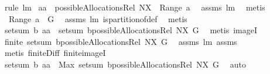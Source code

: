 \begin{isabellebody}
\ {\isacharparenleft}rule\ lm{}{}{\isacharparenright}\isanewline
{}\isamarkupfalse%
\ {\isachardoublequoteopen}{\isacharquery}aa\ {\isasymin}\ possibleAllocationsRel\ {\isacharparenleft}N{\isacharminus}X{\isacharparenright}\ {\isacharparenleft}{\isasymUnion}\ {\isacharparenleft}Range\ a{\isacharparenright}{\isacharparenright}{\isachardoublequoteclose}\ \isamarkupfalse%
\ assms\ lm{}{}\ \isamarkupfalse%
\ metis\isanewline
{}\isamarkupfalse%
\ \isamarkupfalse%
\ {\isachardoublequoteopen}{\isasymUnion}\ {\isacharparenleft}Range\ a{\isacharparenright}\ {\isacharequal}\ G{\isachardoublequoteclose}\ \isamarkupfalse%
\ assms\ lm{}{}\ is{\isacharunderscore}partition{\isacharunderscore}of{\isacharunderscore}def\ \isamarkupfalse%
\ metis\isanewline
{}\isamarkupfalse%
\ \isamarkupfalse%
\ {\isachardoublequoteopen}setsum\ b\ {\isacharquery}aa\ {\isasymin}\ {\isacharparenleft}setsum\ b{\isacharparenright}{\isacharbackquote}{\isacharparenleft}possibleAllocationsRel\ {\isacharparenleft}N{\isacharminus}X{\isacharparenright}\ G{\isacharparenright}{\isachardoublequoteclose}\ \isamarkupfalse%
\ {\isacharparenleft}metis\ imageI{\isacharparenright}\isanewline
{}\isamarkupfalse%
\ \isamarkupfalse%
\ {\isachardoublequoteopen}finite\ {\isacharparenleft}{\isacharparenleft}setsum\ b{\isacharparenright}{\isacharbackquote}{\isacharparenleft}possibleAllocationsRel\ {\isacharparenleft}N{\isacharminus}X{\isacharparenright}\ G{\isacharparenright}{\isacharparenright}{\isachardoublequoteclose}\ \isamarkupfalse%
\ assms\ lm{}{}\ assms{\isacharparenleft}{}{\isacharcomma}{}{\isacharparenright}\isanewline
{}\isamarkupfalse%
\ {\isacharparenleft}metis\ finite{\isacharunderscore}Diff\ finite{\isacharunderscore}imageI{\isacharparenright}\isanewline
{}\isamarkupfalse%
\ \isamarkupfalse%
\ {\isachardoublequoteopen}setsum\ b\ {\isacharquery}aa\ {\isasymle}\ Max\ {\isacharparenleft}{\isacharparenleft}setsum\ b{\isacharparenright}{\isacharbackquote}{\isacharparenleft}possibleAllocationsRel\ {\isacharparenleft}N{\isacharminus}X{\isacharparenright}\ G{\isacharparenright}{\isacharparenright}{\isachardoublequoteclose}\ \isamarkupfalse%
\ auto\isanewline
{}\isamarkupfalse%
\ \isamarkupfalse%

\end{isabellebody}
